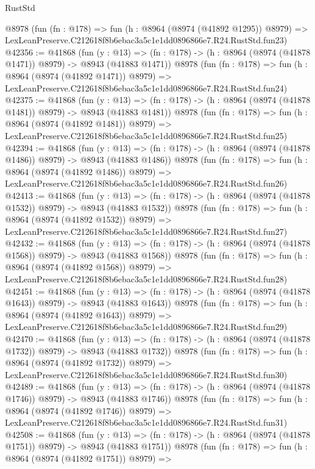 \begin{lexlean}{RustStd}
\begin{coremodule}
    @8978
    (fun (fn : @178) =>
    fun (h : @8964 (@8974 (@41892 @1295)) @8979) =>
    LexLeanPreserve.C212618f8b6ebac3a5c1e1dd0896866e7.R24.RustStd.fun23)
@42356 := @41868
    (fun (y : @13) =>
    (fn : @178) -> (h : @8964 (@8974 (@41878 @1471)) @8979) -> @8943 (@41883 @1471))
    @8978
    (fun (fn : @178) =>
    fun (h : @8964 (@8974 (@41892 @1471)) @8979) =>
    LexLeanPreserve.C212618f8b6ebac3a5c1e1dd0896866e7.R24.RustStd.fun24)
@42375 := @41868
    (fun (y : @13) =>
    (fn : @178) -> (h : @8964 (@8974 (@41878 @1481)) @8979) -> @8943 (@41883 @1481))
    @8978
    (fun (fn : @178) =>
    fun (h : @8964 (@8974 (@41892 @1481)) @8979) =>
    LexLeanPreserve.C212618f8b6ebac3a5c1e1dd0896866e7.R24.RustStd.fun25)
@42394 := @41868
    (fun (y : @13) =>
    (fn : @178) -> (h : @8964 (@8974 (@41878 @1486)) @8979) -> @8943 (@41883 @1486))
    @8978
    (fun (fn : @178) =>
    fun (h : @8964 (@8974 (@41892 @1486)) @8979) =>
    LexLeanPreserve.C212618f8b6ebac3a5c1e1dd0896866e7.R24.RustStd.fun26)
@42413 := @41868
    (fun (y : @13) =>
    (fn : @178) -> (h : @8964 (@8974 (@41878 @1532)) @8979) -> @8943 (@41883 @1532))
    @8978
    (fun (fn : @178) =>
    fun (h : @8964 (@8974 (@41892 @1532)) @8979) =>
    LexLeanPreserve.C212618f8b6ebac3a5c1e1dd0896866e7.R24.RustStd.fun27)
@42432 := @41868
    (fun (y : @13) =>
    (fn : @178) -> (h : @8964 (@8974 (@41878 @1568)) @8979) -> @8943 (@41883 @1568))
    @8978
    (fun (fn : @178) =>
    fun (h : @8964 (@8974 (@41892 @1568)) @8979) =>
    LexLeanPreserve.C212618f8b6ebac3a5c1e1dd0896866e7.R24.RustStd.fun28)
@42451 := @41868
    (fun (y : @13) =>
    (fn : @178) -> (h : @8964 (@8974 (@41878 @1643)) @8979) -> @8943 (@41883 @1643))
    @8978
    (fun (fn : @178) =>
    fun (h : @8964 (@8974 (@41892 @1643)) @8979) =>
    LexLeanPreserve.C212618f8b6ebac3a5c1e1dd0896866e7.R24.RustStd.fun29)
@42470 := @41868
    (fun (y : @13) =>
    (fn : @178) -> (h : @8964 (@8974 (@41878 @1732)) @8979) -> @8943 (@41883 @1732))
    @8978
    (fun (fn : @178) =>
    fun (h : @8964 (@8974 (@41892 @1732)) @8979) =>
    LexLeanPreserve.C212618f8b6ebac3a5c1e1dd0896866e7.R24.RustStd.fun30)
@42489 := @41868
    (fun (y : @13) =>
    (fn : @178) -> (h : @8964 (@8974 (@41878 @1746)) @8979) -> @8943 (@41883 @1746))
    @8978
    (fun (fn : @178) =>
    fun (h : @8964 (@8974 (@41892 @1746)) @8979) =>
    LexLeanPreserve.C212618f8b6ebac3a5c1e1dd0896866e7.R24.RustStd.fun31)
@42508 := @41868
    (fun (y : @13) =>
    (fn : @178) -> (h : @8964 (@8974 (@41878 @1751)) @8979) -> @8943 (@41883 @1751))
    @8978
    (fun (fn : @178) =>
    fun (h : @8964 (@8974 (@41892 @1751)) @8979) =>

\end{coremodule}
\end{lexlean}
